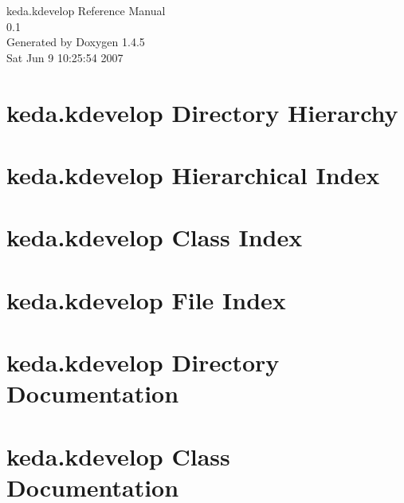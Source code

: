 \documentclass[a4paper]{book}
\begin{document}
\begin{titlepage}
\vspace*{7cm}
\begin{center}
{\Large keda.kdevelop Reference Manual\\[1ex]\large 0.1 }\\
\vspace*{1cm}
{\large Generated by Doxygen 1.4.5}\\
\vspace*{0.5cm}
{\small Sat Jun 9 10:25:54 2007}\\
\end{center}
\end{titlepage}
\clearemptydoublepage
{}
\tableofcontents
\clearemptydoublepage
{}
\chapter{keda.kdevelop Directory Hierarchy}

\chapter{keda.kdevelop Hierarchical Index}

\chapter{keda.kdevelop Class Index}

\chapter{keda.kdevelop File Index}

\chapter{keda.kdevelop Directory Documentation}



\chapter{keda.kdevelop Class Documentation}























\end{document}
